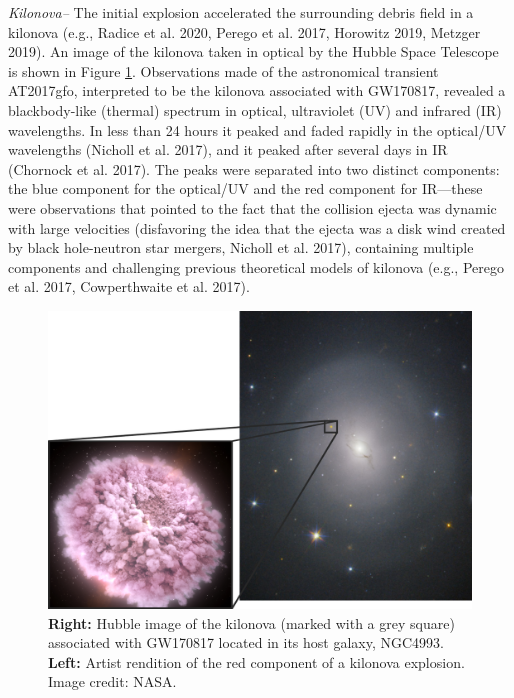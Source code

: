 \documentclass[1.5,11pt]{beavtex}
\begin{document}
\textit{Kilonova–} The initial explosion accelerated the surrounding debris field in a kilonova (e.g., Radice et al. 2020, Perego et al. 2017, Horowitz 2019, Metzger 2019). An image of the kilonova taken in optical by the Hubble Space Telescope is shown in Figure \ref{fig: Hubble image}. Observations made of the astronomical transient AT2017gfo, interpreted to be the kilonova associated with GW170817, revealed a blackbody-like (thermal) spectrum in optical, ultraviolet (UV) and infrared (IR) wavelengths. In less than 24 hours it peaked and faded rapidly in the optical/UV wavelengths (Nicholl et al. 2017), and it peaked after several days in IR (Chornock et al. 2017). The peaks were separated into two distinct components: the blue component for the optical/UV and the red component for IR---these were observations that pointed to the fact that the collision ejecta was dynamic with large velocities (disfavoring the idea that the ejecta was a disk wind created by black hole-neutron star mergers, Nicholl et al. 2017), containing multiple components and challenging previous theoretical models of kilonova (e.g., Perego et al. 2017, Cowperthwaite et al. 2017). 


\begin{figure}[htbp!]
  \centering
  \includegraphics[scale=0.35]{images/ch1/Hubble-kn-square.png}
  \caption{\selectfont  \textbf{Right:} Hubble image of the kilonova (marked with a grey square) associated with GW170817 located in its host galaxy, NGC4993. \textbf{Left:} Artist rendition of the red component of a kilonova explosion. Image credit: NASA.}
  \label{fig: Hubble image}
\end{figure}
\end{document}
